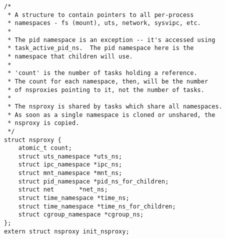 
\begin{lstlisting}
/*
 * A structure to contain pointers to all per-process
 * namespaces - fs (mount), uts, network, sysvipc, etc.
 *
 * The pid namespace is an exception -- it's accessed using
 * task_active_pid_ns.  The pid namespace here is the
 * namespace that children will use.
 *
 * 'count' is the number of tasks holding a reference.
 * The count for each namespace, then, will be the number
 * of nsproxies pointing to it, not the number of tasks.
 *
 * The nsproxy is shared by tasks which share all namespaces.
 * As soon as a single namespace is cloned or unshared, the
 * nsproxy is copied.
 */
struct nsproxy {
	atomic_t count;
	struct uts_namespace *uts_ns;
	struct ipc_namespace *ipc_ns;
	struct mnt_namespace *mnt_ns;
	struct pid_namespace *pid_ns_for_children;
	struct net 	     *net_ns;
	struct time_namespace *time_ns;
	struct time_namespace *time_ns_for_children;
	struct cgroup_namespace *cgroup_ns;
};
extern struct nsproxy init_nsproxy;
\end{lstlisting}
